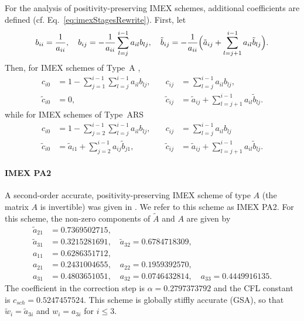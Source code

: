 For the analysis of positivity-preserving IMEX schemes, additional coefficients are defined \cite{hu_etal_2018} (cf. Eq.~\eqref{eq:imexStagesRewrite}).  
First, let
\begin{equation}
  b_{ii} = \frac{1}{a_{ii}}, \quad
  b_{ij} = -\frac{1}{a_{ii}}\sum_{l=j}^{i-1}a_{il}b_{lj}, \quad
  \tilde{b}_{ij} = -\frac{1}{a_{ii}}\Big(\tilde{a}_{ij}+\sum_{l=j+1}^{i-1}a_{il}\tilde{b}_{lj}\Big).  
\end{equation}
Then, for IMEX schemes of Type~A \cite{dimarcoPareschi2013},
\begin{equation}
  \begin{aligned}
    c_{i0} &= 1-\sum_{j=1}^{i-1}\sum_{l=j}^{i-1}a_{il}b_{lj}, \quad &
    c_{ij} &= \sum_{l=j}^{i-1}a_{il}b_{lj}, \\
    \tilde{c}_{i0} &= 0, \quad &
    \tilde{c}_{ij} &= \tilde{a}_{ij} + \sum_{l=j+1}^{i-1}a_{il}\tilde{b}_{lj}.
  \end{aligned}
  \label{eq:positivityCoefficientsA}
\end{equation}
while for IMEX schemes of Type~ARS \cite{ascher_etal_1997}
\begin{equation}
  \begin{aligned}
    c_{i0} &= 1-\sum_{j=2}^{i-1}\sum_{l=j}^{i-1}a_{il}b_{lj}, \quad &
    c_{ij} &= \sum_{l=j}^{i-1}a_{il}b_{lj} \\
    \tilde{c}_{i0} &= \tilde{a}_{i1}+\sum_{j=2}^{i-1}a_{ij}\tilde{b}_{j1}, \quad &
    \tilde{c}_{ij} &= \tilde{a}_{ij}+\sum_{l=j+1}^{i-1}a_{il}\tilde{b}_{lj}.  
  \end{aligned}
  \label{eq:positivityCoefficientsARS}
\end{equation}

\paragraph{IMEX PA2}

A second-order accurate, positivity-preserving IMEX scheme of type $A$ (the matrix $A$ is invertible) was given in \cite{hu_etal_2018}.  
We refer to this scheme as IMEX PA2.  
For this scheme, the non-zero components of $\tilde{A}$ and $A$ are given by
\begin{align*}
  \tilde{a}_{21} &= 0.7369502715, \\
  \tilde{a}_{31} &= 0.3215281691, \quad \tilde{a}_{32} = 0.6784718309, \\
  a_{11} &= 0.6286351712, \\
  a_{21} &= 0.2431004655, \quad a_{22} = 0.1959392570, \\
  a_{31} &= 0.4803651051, \quad a_{32} = 0.0746432814, \quad a_{33} = 0.4449916135. 
\end{align*}
The coefficient in the correction step is $\alpha = 0.2797373792$ and the CFL constant is $c_{sch} = 0.5247457524$.
This scheme is globally stiffly accurate (GSA), so that $\tilde{w}_{i}=\tilde{a}_{3i}$ and $w_{i}=a_{3i}$ for $i\le3$.

